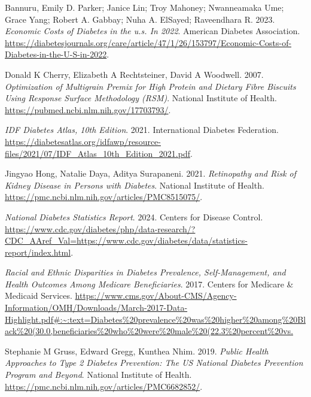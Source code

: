 \documentclass[
]{article}
\newlength{\cslhangindent}
\newenvironment{CSLReferences}[2] %
 {\begin{list}{}{%
  \setlength{\itemindent}{0pt}
  \setlength{\leftmargin}{0pt}
  \setlength{\parsep}{0pt}
  \ifodd #1
   \setlength{\leftmargin}{\cslhangindent}
   \setlength{\itemindent}{-1\cslhangindent}
  \fi
  \setlength{\itemsep}{#2\baselineskip}}}
 {\end{list}}
\begin{document}
\label{refs}
\begin{CSLReferences}{1}{0}
Bannuru, Emily D. Parker; Janice Lin; Troy Mahoney; Nwanneamaka Ume;
Grace Yang; Robert A. Gabbay; Nuha A. ElSayed; Raveendhara R. 2023.
\emph{Economic Costs of Diabetes in the u.s. In 2022}. American Diabetes
Association.
\url{https://diabetesjournals.org/care/article/47/1/26/153797/Economic-Costs-of-Diabetes-in-the-U-S-in-2022}.

Donald K Cherry, Elizabeth A Rechtsteiner, David A Woodwell. 2007.
\emph{Optimization of Multigrain Premix for High Protein and Dietary
Fibre Biscuits Using Response Surface Methodology (RSM)}. National
Institute of Health. \url{https://pubmed.ncbi.nlm.nih.gov/17703793/}.

\emph{IDF Diabetes Atlas, 10th Edition}. 2021. International Diabetes
Federation.
\url{https://diabetesatlas.org/idfawp/resource-files/2021/07/IDF_Atlas_10th_Edition_2021.pdf}.

Jingyao Hong, Natalie Daya, Aditya Surapaneni. 2021. \emph{Retinopathy
and Risk of Kidney Disease in Persons with Diabetes}. National Institute
of Health. \url{https://pmc.ncbi.nlm.nih.gov/articles/PMC8515075/}.

\emph{National Diabetes Statistics Report}. 2024. Centers for Disease
Control.
\url{https://www.cdc.gov/diabetes/php/data-research/?CDC_AAref_Val=https://www.cdc.gov/diabetes/data/statistics-report/index.html}.

\emph{Racial and Ethnic Disparities in Diabetes Prevalence,
Self-Management, and Health Outcomes Among Medicare Beneficiaries}.
2017. Centers for Medicare \& Medicaid Services.
\url{https://www.cms.gov/About-CMS/Agency-Information/OMH/Downloads/March-2017-Data-Highlight.pdf\#:~:text=Diabetes\%20prevalence\%20was\%20higher\%20among\%20Black\%20(30.0,beneficiaries\%20who\%20were\%20male\%20(22.3\%20percent\%20vs.}

Stephanie M Gruss, Edward Gregg, Kunthea Nhim. 2019. \emph{Public Health
Approaches to Type 2 Diabetes Prevention: The US National Diabetes
Prevention Program and Beyond}. National Institute of Health.
\url{https://pmc.ncbi.nlm.nih.gov/articles/PMC6682852/}.

\end{CSLReferences}
\end{document}
